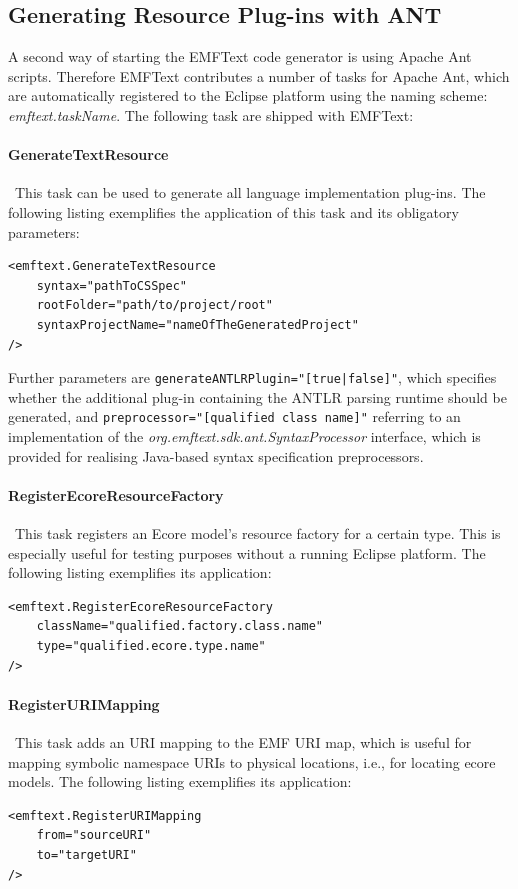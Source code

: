 	\subsection{Generating Resource Plug-ins with ANT}
	\label{sec:process_generating_ant}
	A second way of starting the EMFText code generator is using Apache Ant
	scripts. Therefore EMFText contributes a number of tasks for Apache Ant,
	which are automatically registered to the Eclipse platform using the
	naming scheme: \emph{emftext.taskName}. The following task are shipped with
	EMFText:
	
	\paragraph*{GenerateTextResource}~This task can be used to generate all
	language implementation plug-ins. The following listing exemplifies the
	application of this task and its obligatory parameters:
\lstset{language=XML}
\begin{lstlisting}
<emftext.GenerateTextResource
	syntax="pathToCSSpec"
	rootFolder="path/to/project/root"
	syntaxProjectName="nameOfTheGeneratedProject"
/>
\end{lstlisting}
	Further parameters are \texttt{generateANTLRPlugin="[true|false]"}, which
	specifies whether the additional plug-in
	containing the ANTLR parsing runtime should be generated, and
	\texttt{pre\-processor="[qualified class name]"} referring to an implementation
	of the \emph{org.emftext.sdk.\-ant.Syntax\-Processor} interface, which is provided
	for realising Java-based syntax specification preprocessors. 
	
	\paragraph*{RegisterEcoreResourceFactory}~This task registers an Ecore
	model's resource factory for a certain type. This is especially useful for testing
	purposes without a running Eclipse platform.  
	The following listing exemplifies its application:
\lstset{language=XML}
\begin{lstlisting}
<emftext.RegisterEcoreResourceFactory
	className="qualified.factory.class.name"
	type="qualified.ecore.type.name"
/>
\end{lstlisting}
	\paragraph*{RegisterURIMapping}~This task adds an URI mapping to the EMF URI
	map, which is useful for mapping symbolic namespace URIs to physical locations, i.e., 
	for locating ecore models. 
	The following listing exemplifies its application:
\lstset{language=XML}
\begin{lstlisting}
<emftext.RegisterURIMapping
	from="sourceURI"
	to="targetURI"
/>
\end{lstlisting}

